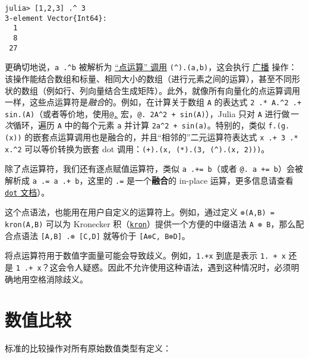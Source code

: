 \begin{verbatim}
julia> [1,2,3] .^ 3
3-element Vector{Int64}:
  1
  8
 27
\end{verbatim}



更确切地说，\texttt{a .{\textasciicircum}b} 被解析为 \hyperlink{17801130558550430478}{“点运算” 调用} \texttt{({\textasciicircum}).(a,b)}，这会执行 \hyperlink{1924664524817847375}{广播} 操作：该操作能结合数组和标量、相同大小的数组（进行元素之间的运算），甚至不同形状的数组（例如行、列向量结合生成矩阵）。此外，就像所有向量化的点运算调用一样，这些点运算符是\emph{融合}的。例如，在计算关于数组 \texttt{A} 的表达式 \texttt{2 .* A.{\textasciicircum}2 .+ sin.(A)}（或者等价地，使用\hyperlink{16688502228717894452}{\texttt{@.}} 宏，\texttt{@. 2A{\textasciicircum}2 + sin(A)}），Julia 只对 \texttt{A} 进行做\emph{一次}循环，遍历 \texttt{A} 中的每个元素 \texttt{a} 并计算 \texttt{2a{\textasciicircum}2 + sin(a)}。特别的，类似 \texttt{f.(g.(x))} 的嵌套点运算调用也是融合的，并且“相邻的”二元运算符表达式 \texttt{x .+ 3 .* x.{\textasciicircum}2} 可以等价转换为嵌套 dot 调用：\texttt{(+).(x, (*).(3, ({\textasciicircum}).(x, 2)))}。



除了点运算符，我们还有逐点赋值运算符，类似 \texttt{a .+= b}（或者 \texttt{@. a += b}）会被解析成 \texttt{a .= a .+ b}，这里的 \texttt{.=} 是一个\textbf{融合}的 in-place 运算，更多信息请查看 \hyperlink{17801130558550430478}{\texttt{dot} 文档}）。



这个点语法，也能用在用户自定义的运算符上。例如，通过定义 \texttt{⊗(A,B) = kron(A,B)} 可以为 Kronecker 积（\hyperlink{14153417388267953812}{\texttt{kron}}）提供一个方便的中缀语法 \texttt{A ⊗ B}，那么配合点语法 \texttt{[A,B] .⊗ [C,D]} 就等价于 \texttt{[A⊗C, B⊗D]}。



将点运算符用于数值字面量可能会导致歧义。例如，\texttt{1.+x} 到底是表示 \texttt{1. + x} 还是 \texttt{1 .+ x}？这会令人疑惑。因此不允许使用这种语法，遇到这种情况时，必须明确地用空格消除歧义。



\hypertarget{2028216132575181376}{}


\section{数值比较}



标准的比较操作对所有原始数值类型有定义：




